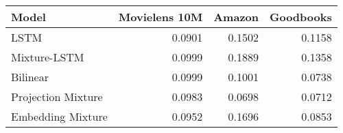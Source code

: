 \begin{tabular}{lrrr}
\toprule
 Model              &   Movielens 10M &   Amazon &   Goodbooks \\
\midrule
 LSTM               &          0.0901 &   0.1502 &      0.1158 \\
 Mixture-LSTM       &          0.0999 &   0.1889 &      0.1358 \\
 \midrule
 Bilinear           &          0.0999 &   0.1001 &      0.0738 \\
 Projection Mixture &          0.0983 &   0.0698 &      0.0712 \\
 Embedding Mixture  &          0.0952 &   0.1696 &      0.0853 \\
\bottomrule
\end{tabular}